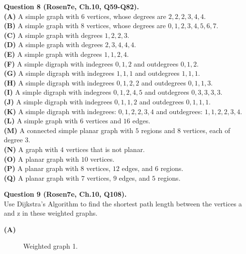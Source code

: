 \documentclass[jou]{apa6}
\begin{document}
\vspace{10pt}
{\bf Question 8 (Rosen7e, Ch.10, Q59-Q82).}\\
{\bf (A)} A simple graph with $6$ vertices, whose degrees are $2,2,2,3,4,4$.\\
{\bf (B)} A simple graph with $8$ vertices, whose degrees are $0,1,2,3,4,5,6,7$.\\
{\bf (C)} A simple graph with degrees $1,2,2,3$.\\
{\bf (D)} A simple graph with degrees $2,3,4,4,4$.\\
{\bf (E)} A simple graph with degrees $1,1,2,4$.\\
{\bf (F)} A simple digraph with indegrees $0,1,2$ and outdegrees $0,1,2$.\\
{\bf (G)} A simple digraph with indegrees $1,1,1$ and outdegrees $1,1,1$.\\
{\bf (H)} A simple digraph with indegrees $0,1,2,2$ and outdegrees $0,1,1,3$.\\
{\bf (I)} A simple digraph with indegrees $0,1,2,4,5$ and outdegrees $0,3,3,3,3$.\\
{\bf (J)} A simple digraph with indegrees $0,1,1,2$ and outdegrees $0,1,1,1$.\\
{\bf (K)} A simple digraph with indegrees: $0,1,2,2,3,4$ and outdegrees: $1,1,2,2,3,4$.\\
{\bf (L)} A simple graph with $6$ vertices and $16$ edges.\\
{\bf (M)} A connected simple planar graph with $5$ regions and $8$ vertices, each of degree $3$.\\
{\bf (N)} A graph with $4$ vertices that is not planar.\\
{\bf (O)} A planar graph with $10$ vertices.\\
{\bf (P)} A planar graph with $8$ vertices, $12$ edges, and $6$ regions.\\
{\bf (Q)} A planar graph with $7$ vertices, $9$ edges, and $5$ regions.



\vspace{10pt}
{\bf Question 9 (Rosen7e, Ch.10, Q108).}\\
Use Dijkstra’s Algorithm to find the shortest path length between 
the vertices a and z in these weighted graphs.

{\bf (A)}
\begin{figure}[!htb]
\caption{\label{fig:dijkstra-graph1} Weighted graph 1.}
\end{figure}
\end{document}
